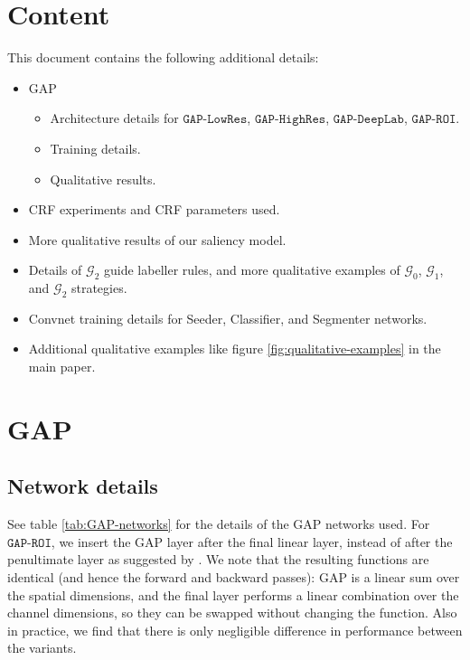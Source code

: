 \documentclass[british,10pt,twocolumn,letterpaper]{article}
\begin{document}
\section{\label{sec:supp-content}Content}

This document contains the following additional details:
\begin{itemize}
\item GAP

\begin{itemize}
\item Architecture details for $\mathtt{GAP}\text{-}\mathtt{LowRes}$, $\mathtt{GAP}\text{-}\mathtt{HighRes}$,
$\mathtt{GAP}\text{-}\mathtt{DeepLab}$, $\mathtt{GAP}\text{-}\mathtt{ROI}$.
\item Training details.
\item Qualitative results.
\end{itemize}
\item CRF experiments and CRF parameters used.
\item More qualitative results of our saliency model.
\item Details of $\mathcal{G}_{2}$ guide labeller rules, and more qualitative
examples of $\mathcal{G}_{0}$, $\mathcal{G}_{1}$, and $\mathcal{G}_{2}$
strategies.
\item Convnet training details for Seeder, Classifier, and Segmenter networks.
\item Additional qualitative examples like figure \ref{fig:qualitative-examples} in the main paper.
\end{itemize}


\section{\label{sec:supp-gap}GAP}

\subsection{\label{sec:supp-gap-net}Network details}

See table \ref{tab:GAP-networks} for the details of the GAP networks
used. For $\mathtt{GAP}\text{-}\mathtt{ROI}$, we insert the GAP layer
after the final linear layer, instead of after the penultimate layer
as suggested by \cite{zhou2015cnnlocalization}. We note that the
resulting functions are identical (and hence the forward and backward
passes): GAP is a linear sum over the spatial dimensions, and the
final layer performs a linear combination over the channel dimensions,
so they can be swapped without changing the function. Also in practice,
we find that there is only negligible difference in performance between
the variants.
\end{document}
